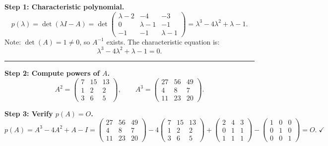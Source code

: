 \documentclass[12pt,a3paper]{article}
\begin{document}
\begin{tcolorbox}[enhanced,breakable,
  colback=cE!4,colframe=cE,boxrule=0.8pt,arc=5pt,
  title={\textbf{Answer --- Inverse via Cayley-Hamilton for
    $A=\begin{pmatrix}2&4&3\\0&1&1\\1&1&1\end{pmatrix}$}},
  fonttitle=\bfseries\color{white},colbacktitle=cE]

\textbf{Step 1: Characteristic polynomial.}
\[
  p(\lambda) = \det(\lambda I - A)
  = \det\begin{pmatrix}\lambda-2&-4&-3\\0&\lambda-1&-1\\-1&-1&\lambda-1\end{pmatrix}
  = \lambda^3 - 4\lambda^2 + \lambda - 1.
\]
Note: $\det(A) = 1 \neq 0$, so $A^{-1}$ exists. The characteristic equation is:
\[
  \lambda^3 - 4\lambda^2 + \lambda - 1 = 0.
\]

\medskip\textcolor{cE}{\rule{\textwidth}{0.4pt}}

\textbf{Step 2: Compute powers of $A$.}
\[
  A^2 = \begin{pmatrix}7&15&13\\1&2&2\\3&6&5\end{pmatrix}, \qquad
  A^3 = \begin{pmatrix}27&56&49\\4&8&7\\11&23&20\end{pmatrix}.
\]

\textbf{Step 3: Verify $p(A) = O$.}
\[
  p(A) = A^3 - 4A^2 + A - I
  = \begin{pmatrix}27&56&49\\4&8&7\\11&23&20\end{pmatrix}
  - 4\begin{pmatrix}7&15&13\\1&2&2\\3&6&5\end{pmatrix}
  + \begin{pmatrix}2&4&3\\0&1&1\\1&1&1\end{pmatrix}
  - \begin{pmatrix}1&0&0\\0&1&0\\0&0&1\end{pmatrix}
  = O.\;\checkmark
\]


\end{tcolorbox}
\end{document}
